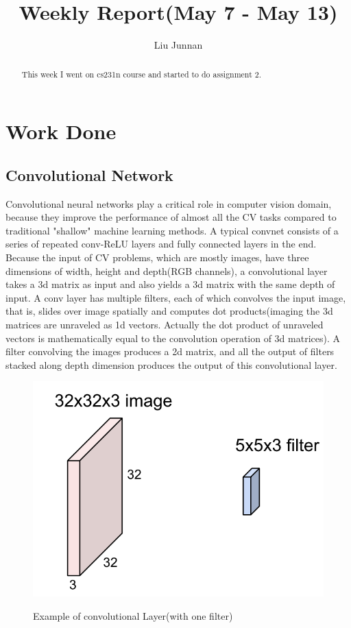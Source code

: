 \documentclass{article} %
\title{Weekly Report(May 7 - May 13)}
\author{
Liu Junnan
}
\begin{document}
\maketitle

\begin{abstract}
This week I went on cs231n course and started to do assignment 2.
\end{abstract}

\section{Work Done}
\subsection{Convolutional Network}
Convolutional neural networks play a critical role in computer vision domain, because they improve the performance of almost all the CV tasks compared to traditional "shallow" machine learning methods. A typical convnet consists of a series of repeated conv-ReLU layers and fully connected layers in the end. Because the input of CV problems, which are mostly images, have three dimensions of width, height and depth(RGB channels), a convolutional layer takes a 3d matrix as input and also yields a 3d matrix with the same depth of input. A conv layer has multiple filters, each of which convolves the input image, that is, slides over image spatially and computes dot products(imaging the 3d matrices are unraveled as 1d vectors. Actually the dot product of unraveled vectors is mathematically equal to the convolution operation of 3d matrices). A filter convolving the images produces a 2d matrix, and all the output of filters stacked along depth dimension produces the output of this convolutional layer.

\begin{figure}[H]
    \centering
    \includegraphics[width=.4\textwidth]{convlayer.png}
    \label{fig:convlayer}
    \caption{Example of convolutional Layer(with one filter)}
\end{figure}
\end{document}
